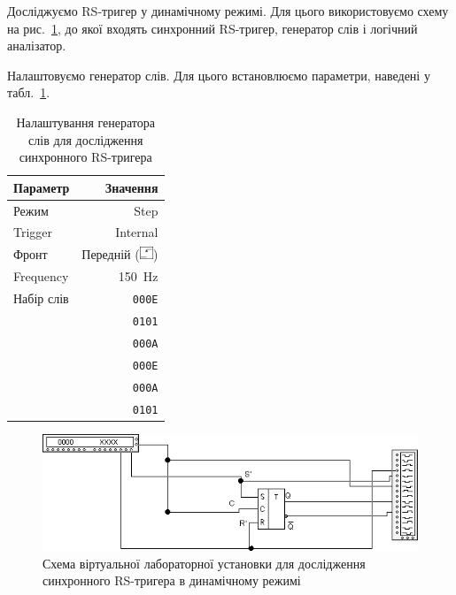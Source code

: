 \documentclass[a4paper,oneside,DIV=10,12pt]{scrartcl}
\newcommand\hexword[1]{\texttt{#1}}
\begin{document}
			Досліджуємо RS-тригер у динамічному режимі. Для цього використовуємо схему на рис.~\ref{fig:rsc-flipflop-dynamic-mode-schematic}, до якої входять синхронний RS-тригер, генератор слів і логічний аналізатор.
			
			Налаштовуємо генератор слів. Для цього встановлюємо параметри, наведені у табл.~\ref{tab:rsc-flipflop-word-generator-settings}.
			
			\begin{table}[!htbp]
			\centering
				\begin{tabular}{lr}
					\toprule
						Параметр & Значення\\
					\midrule
						Режим & Step\\
						Trigger & Internal\\
						Фронт & Передній (\includegraphics[height = 1em]{assets/front-setting-button.png})\\
						Frequency & 150~Hz\\
						Набір слів & \hexword{000E}\\
						           & \hexword{0101}\\
						           & \hexword{000A}\\
						           & \hexword{000E}\\
						           & \hexword{000A}\\
						           & \hexword{0101}\\
					\bottomrule
				\end{tabular}
			\caption{Налаштування генератора слів для дослідження синхронного RS-тригера}
			\label{tab:rsc-flipflop-word-generator-settings}
			\end{table}
			
			\begin{figure}[!htbp]
			\centering
				\includegraphics[width = \textwidth]{assets/02-02-rs-sync-flipflop-dynamic-mode-schematic.png}
			\caption{Схема віртуальної лабораторної установки для дослідження синхронного RS-тригера в динамічному режимі}
			\label{fig:rsc-flipflop-dynamic-mode-schematic}
			\end{figure}
			
\end{document}
